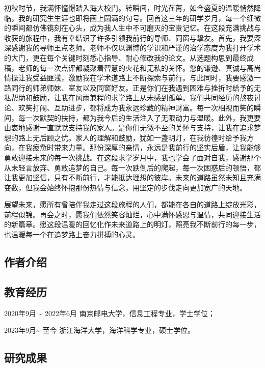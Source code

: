 \documentclass[
  12pt,
]{article}
\begin{document}
初秋时节，我满怀憧憬踏入海大校门。转瞬间，时光荏苒，如今盛夏的温暖悄然降临，我的研究生生涯也即将画上圆满的句号。回首这三年的研学岁月，每一个细微的瞬间都仿佛镌刻在心头，成为我人生中不可磨灭的宝贵记忆。在这段充满挑战与收获的旅程中，我有幸结识了许多引领我前行的导师、同窗与挚友。首先，我要深深感谢我的导师王点老师。老师不仅以渊博的学识和严谨的治学态度为我打开学术的大门，更在每个关键时刻悉心指导、耐心修改我的论文。从选题构思到最终成稿，老师的每一次点评都凝聚着智慧的火花和无私的关怀。您的谦逊、真诚与高尚情操让我受益匪浅，激励我在学术道路上不断探索与前行。与此同时，我要感激一路同行的师弟师妹、室友以及同窗好友。正是你们在我遇到困难与挫折时给予的无私帮助和鼓励，让我在风雨兼程的求学路上从未感到孤单。我们共同经历的熬夜讨论、欢笑打闹、互助进步，都将成为我永远珍藏的精神财富。每一次相视而笑的瞬间，每一次默契的扶持，都为我今后的生活注入了无限动力与温暖。此外，我更要由衷地感谢一直默默支持我的家人。是你们无微不至的关怀与支持，让我在追求梦想的路上无后顾之忧。家人的理解和鼓励，犹如一盏明灯，在我彷徨时给予我方向，在我疲惫时带来力量。那份深厚的亲情，永远是我前行的坚实后盾，让我能够勇敢迎接未来的每一次挑战。在这段求学岁月中，我也学会了面对自我，感谢那个从未轻言放弃、勇敢追梦的自己。每一次跌倒后的爬起，每一次困惑后的顿悟，都让我更加坚信，只有不断前行，才能抵达理想的彼岸。未来的道路虽然未知且充满变数，但我会始终怀抱那份热情与信念，用坚定的步伐走向更加宽广的天地。

展望未来，愿所有曾陪伴我走过这段旅程的人们，都能在各自的道路上绽放光彩，前程似锦。再会之时，愿我们依然笑容灿烂，心中满怀感恩与温情，共同迎接生活的新篇章。愿这段温暖的回忆化作未来道路上的明灯，照亮我不断前行的每一步，也温暖每一个在追梦路上奋力拼搏的心灵。

\subsection{作者介绍}\label{ux4f5cux8005ux4ecbux7ecd}

\subsection{教育经历}\label{ux6559ux80b2ux7ecfux5386}

2020年9月 \textasciitilde{} 2022年6月
南京邮电大学，信息工程专业，学士学位；

2023年9月\textasciitilde{} 至今 浙江海洋大学，海洋科学专业，硕士学位。

\subsection{研究成果}\label{ux7814ux7a76ux6210ux679c}
\end{document}
